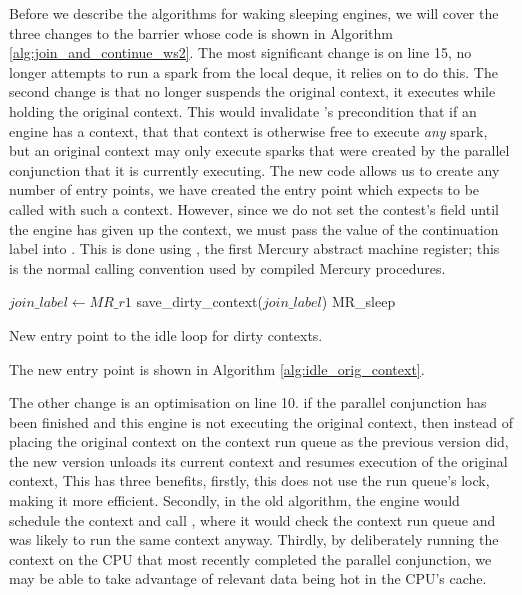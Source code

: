 Before we describe the algorithms for waking sleeping engines,
we will cover the three changes to the \joinandcontinue barrier
whose code is shown in Algorithm \ref{alg:join_and_continue_ws2}.
The most significant change is on line 15,
\joinandcontinue no longer attempts to run a spark from the local deque,
it relies on \idle to do this.
The second change is that \joinandcontinue no longer suspends the original
context, it executes \idle while holding the original context.
This would invalidate \idle's precondition that if an engine has a context,
that that context is otherwise free to execute \emph{any} spark,
but an original context may only execute sparks that were created by the
parallel conjunction that it is currently executing.
The new \idle code allows us to create any number of entry points,
we have created the \idleorigcontext entry point which expects to be called
with such a context.
However, since we do not set the contest's  field until
the engine has given up the context,
we must pass the value of the continuation label into \idleorigcontext.
This is done using , the first Mercury abstract machine
register;
this is the normal calling convention used by compiled Mercury procedures.

\begin{algorithm}
\begin{algorithmic}
        \State $join\_label \gets MR\_r1$
        \State {}
        \State {}
        \State save\_dirty\_context($join\_label$)
        \State {}
        \Goto MR\_sleep
    \EndProcedure
\end{algorithmic}
\caption{New entry point to the idle loop for dirty contexts.}
\label{alg:idle_orig_context}
\end{algorithm}

The new entry point \idleorigcontext is shown in Algorithm
\ref{alg:idle_orig_context}.

The other change is an optimisation on line 10.
if the parallel conjunction has been finished and this engine is not
executing the original context,
then instead of placing the original context on the context run queue as the
previous version did,
the new version unloads its current context and resumes execution of the
original context,
This has three benefits,
firstly, this does not use the run queue's lock,
making it more efficient.
Secondly, in the old algorithm, the engine would schedule the context and
call \idle,
where it would check the context run queue and was likely to run the same
context anyway.
Thirdly, by deliberately running the context on the CPU that most
recently completed the parallel conjunction,
we may be able to take advantage of relevant data being hot in the CPU's
cache.

